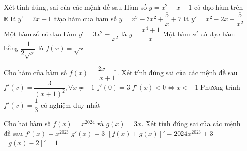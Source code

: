 \begin{ex}%
 Xét tính đúng, sai của các mệnh đề  sau
  \choiceTF
  {\True Hàm số $y=x^2+x+1$ có đạo hàm  trên $\mathbb{R}$ là $y'=2x+1$}
  {Đạo hàm của hàm số  $y=x^3-2x^2+\dfrac{5}{x}+7$ là $y'=x^2-2x-\dfrac{5}{x^2}$}
  {\True Một hàm số có đạo hàm $y'=3x^2-\dfrac{1}{x^2}$  là $y=\dfrac{x^4+1}{x}$}
  {\True Một hàm số có đạo hàm bằng $\dfrac{1}{2\sqrt{x}}$ là  $f(x)=\sqrt{x}$}
\end{ex}

\begin{ex}%
 Cho hàm của hàm số $f(x)=\dfrac{2x-1}{x+1}$. Xét tính đúng sai của các mệnh đề  sau
  \choiceTF
  {\True $f'(x)=\dfrac{3}{(x+1)^2}, \forall x\neq -1$} 
   {\True $f'(0)=3$}
  {$f'(x)<0\Leftrightarrow  x<-1$}
  {Phương trình $f'(x)=\dfrac{1}{3}$  có nghiệm duy nhất}
\end{ex}

\begin{ex}%
 Cho hai hàm số $f(x)=x^{2024}$ và  $g(x)=3x$. Xét tính đúng sai của các mệnh đề sau
 \choiceTF 
   {$f'(x)=x^{2023}$}
   {\True $g'(x)=3$}
  {\True $\left[f(x)+g(x)\right]'=2024x^{2023}+3$} 
  {$\left[g(x)-2\right]'=1$} 
\end{ex}

